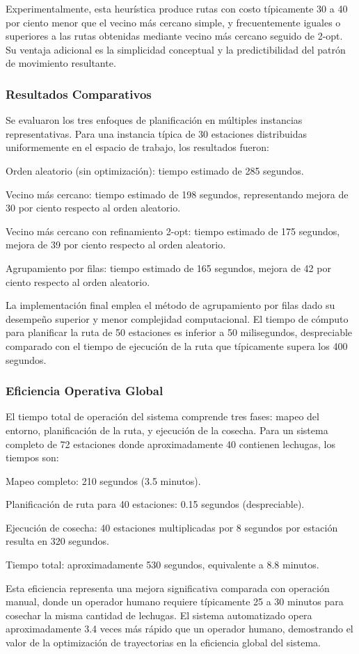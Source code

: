 Experimentalmente, esta heurística produce rutas con costo típicamente 30 a 40 por ciento menor que el vecino más cercano simple, y frecuentemente iguales o superiores a las rutas obtenidas mediante vecino más cercano seguido de 2-opt. Su ventaja adicional es la simplicidad conceptual y la predictibilidad del patrón de movimiento resultante.

\subsubsection{Resultados Comparativos}

Se evaluaron los tres enfoques de planificación en múltiples instancias representativas. Para una instancia típica de 30 estaciones distribuidas uniformemente en el espacio de trabajo, los resultados fueron:

Orden aleatorio (sin optimización): tiempo estimado de 285 segundos.

Vecino más cercano: tiempo estimado de 198 segundos, representando mejora de 30 por ciento respecto al orden aleatorio.

Vecino más cercano con refinamiento 2-opt: tiempo estimado de 175 segundos, mejora de 39 por ciento respecto al orden aleatorio.

Agrupamiento por filas: tiempo estimado de 165 segundos, mejora de 42 por ciento respecto al orden aleatorio.

La implementación final emplea el método de agrupamiento por filas dado su desempeño superior y menor complejidad computacional. El tiempo de cómputo para planificar la ruta de 50 estaciones es inferior a 50 milisegundos, despreciable comparado con el tiempo de ejecución de la ruta que típicamente supera los 400 segundos.

\subsubsection{Eficiencia Operativa Global}

El tiempo total de operación del sistema comprende tres fases: mapeo del entorno, planificación de la ruta, y ejecución de la cosecha. Para un sistema completo de 72 estaciones donde aproximadamente 40 contienen lechugas, los tiempos son:

Mapeo completo: 210 segundos (3.5 minutos).

Planificación de ruta para 40 estaciones: 0.15 segundos (despreciable).

Ejecución de cosecha: 40 estaciones multiplicadas por 8 segundos por estación resulta en 320 segundos.

Tiempo total: aproximadamente 530 segundos, equivalente a 8.8 minutos.

Esta eficiencia representa una mejora significativa comparada con operación manual, donde un operador humano requiere típicamente 25 a 30 minutos para cosechar la misma cantidad de lechugas. El sistema automatizado opera aproximadamente 3.4 veces más rápido que un operador humano, demostrando el valor de la optimización de trayectorias en la eficiencia global del sistema.